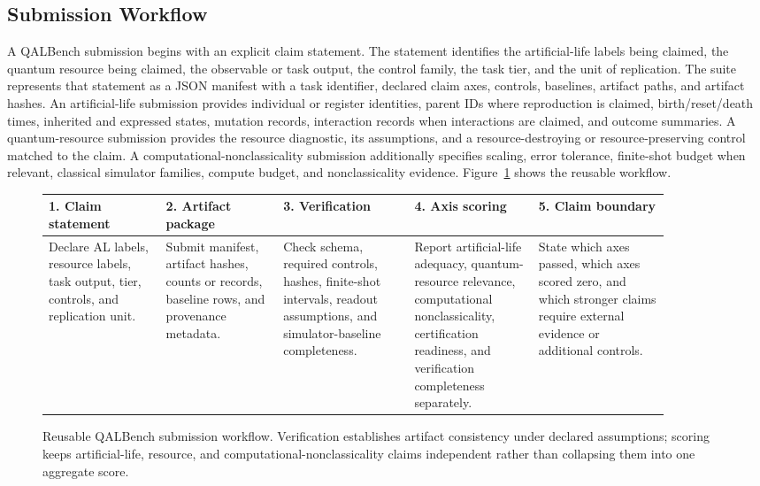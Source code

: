 \documentclass[11pt]{article}
\begin{document}
\subsection{Submission Workflow}

A QALBench submission begins with an explicit claim statement. The statement identifies the artificial-life labels being claimed, the quantum resource being claimed, the observable or task output, the control family, the task tier, and the unit of replication. The suite represents that statement as a JSON manifest with a task identifier, declared claim axes, controls, baselines, artifact paths, and artifact hashes. An artificial-life submission provides individual or register identities, parent IDs where reproduction is claimed, birth/reset/death times, inherited and expressed states, mutation records, interaction records when interactions are claimed, and outcome summaries. A quantum-resource submission provides the resource diagnostic, its assumptions, and a resource-destroying or resource-preserving control matched to the claim. A computational-nonclassicality submission additionally specifies scaling, error tolerance, finite-shot budget when relevant, classical simulator families, compute budget, and nonclassicality evidence. Figure~\ref{fig:submission-workflow} shows the reusable workflow.

\begin{figure}[t]
\centering
\scriptsize
\setlength{\tabcolsep}{3pt}
\renewcommand{\arraystretch}{1.14}
\begin{tabular}{P{0.17\linewidth}P{0.17\linewidth}P{0.19\linewidth}P{0.18\linewidth}P{0.19\linewidth}}
\toprule
\textbf{1. Claim statement} & \textbf{2. Artifact package} & \textbf{3. Verification} & \textbf{4. Axis scoring} & \textbf{5. Claim boundary} \\
\midrule
Declare AL labels, resource labels, task output, tier, controls, and replication unit. & Submit manifest, artifact hashes, counts or records, baseline rows, and provenance metadata. & Check schema, required controls, hashes, finite-shot intervals, readout assumptions, and simulator-baseline completeness. & Report artificial-life adequacy, quantum-resource relevance, computational nonclassicality, certification readiness, and verification completeness separately. & State which axes passed, which axes scored zero, and which stronger claims require external evidence or additional controls. \\
\bottomrule
\end{tabular}
\caption{Reusable QALBench submission workflow. Verification establishes artifact consistency under declared assumptions; scoring keeps artificial-life, resource, and computational-nonclassicality claims independent rather than collapsing them into one aggregate score.}
\label{fig:submission-workflow}
\end{figure}
\end{document}
